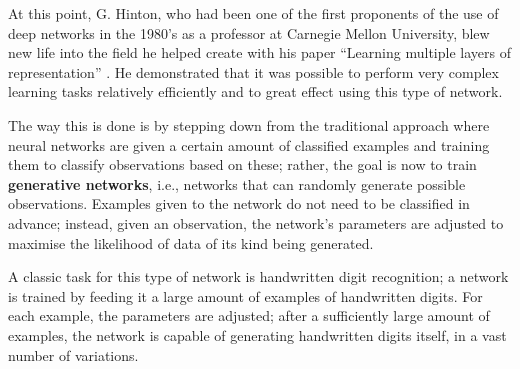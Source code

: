 At this point, G. Hinton, who had been one of the first proponents of
the use of deep networks in the 1980's as a professor at Carnegie
Mellon University, blew new life into the field he helped create with
his paper ``Learning multiple layers of representation''
\citep{hinton2007learning}. He demonstrated that it was possible to
perform very complex learning tasks relatively efficiently and to
great effect using this type of network.

The way this is done is by stepping down from the traditional approach
where neural networks are given a certain amount of classified
examples and training them to classify observations based on these;
rather, the goal is now to train \textbf{generative networks}, i.e.,
networks that can randomly generate possible observations. Examples
given to the network do not need to be classified in advance; instead,
given an observation, the network's parameters are adjusted to
maximise the likelihood of data of its kind being
generated. 

A classic task for this type of network is handwritten digit
recognition; a network is trained by feeding it a large amount of
examples of handwritten digits. For each example, the parameters are
adjusted; after a sufficiently large amount of examples, the network
is capable of generating handwritten digits itself, in a vast number
of variations.




